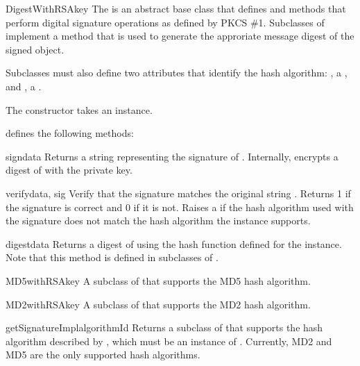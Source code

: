 \documentclass{howto}
\begin{document}
\begin{classdesc}{DigestWithRSA}{key}
The  is an abstract base class that defines
 and  methods that perform digital
signature operations as defined by PKCS \#1.  Subclasses of
 implement a  method that is used
to generate the approriate message digest of the signed object.

Subclasses must also define two attributes that identify the hash
algorithm: , a
, and , a
.

The constructor takes an  instance.

 defines the following methods:

\begin{methoddesc}{sign}{data}
Returns a string representing the signature of . Internally,
encrypts a digest of  with the private key. 
\end{methoddesc}

\begin{methoddesc}{verify}{data, sig}
Verify that the signature  matches the original string
.  Returns 1 if the signature is correct and 0 if it is
not. Raises a  if the hash algorithm used with
the signature does not match the hash algorithm the instance supports.
\end{methoddesc}

\begin{methoddesc}{digest}{data}
Returns a digest of  using the hash function defined for the
instance.  Note that this method is defined in subclasses of
. 
\end{methoddesc}

\end{classdesc}

\begin{classdesc}{MD5withRSA}{key}
A subclass of  that supports the MD5 hash
algorithm. 
\end{classdesc}

\begin{classdesc}{MD2withRSA}{key}
A subclass of  that supports the MD2 hash
algorithm. 
\end{classdesc}

\begin{funcdesc}{getSignatureImpl}{algorithmId}
Returns a subclass of  that supports the hash
algorithm described by , which must be an instance of
.  Currently, MD2 and MD5 are the only
supported hash algorithms.
\end{funcdesc}
\end{document}
